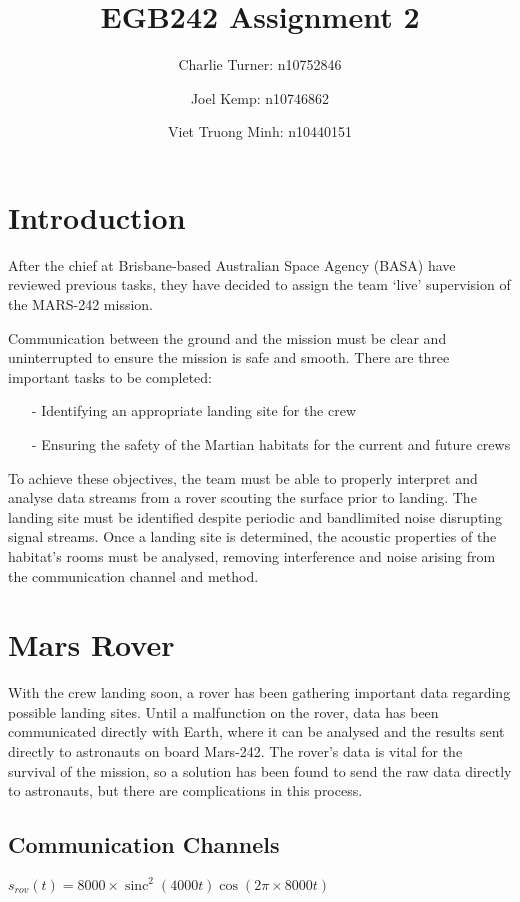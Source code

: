 \documentclass[a4paper]{article}
\author{
    Charlie Turner: n10752846
    \and
    Joel Kemp: n10746862
    \and
    Viet Truong Minh: n10440151
}
\title{EGB242 Assignment 2}
\DeclareMathOperator{\sinc}{sinc}
\begin{document}
\begin{titlingpage}
    \maketitle
\end{titlingpage}

\section{Introduction}

After the chief at Brisbane-based Australian Space Agency (BASA) have reviewed
previous tasks, they have decided to assign the team `live' supervision of the
MARS-242 mission.

Communication between the ground and the mission must be clear and
uninterrupted to ensure the mission is safe and smooth. There are three
important tasks to be completed:
\begin{itemize}
    \item[-] Identifying an appropriate landing site for the crew
    \item[-] Ensuring the safety of the Martian habitats for the current and future crews
\end{itemize}

\noindent To achieve these objectives, the team must be able to properly interpret and
analyse data streams from a rover scouting the surface prior to landing.
The landing site must be identified despite periodic and bandlimited noise
disrupting signal streams. Once a landing site is determined, the acoustic
properties of the habitat's rooms must be analysed, removing interference and
noise arising from the communication channel and method.

\section{Mars Rover}

With the crew landing soon, a rover has been gathering important data regarding
possible landing sites. Until a malfunction on the rover, data has been
communicated directly with Earth, where it can be analysed and the results sent
directly to astronauts on board Mars-242. The rover's data is vital for the
survival of the mission, so a solution has been found to send the raw data
directly to astronauts, but there are complications in this process.

\subsection*{Communication Channels}
\begin{math}
    s_{rov}(t) = 8000 \times \sinc^2(4000t)\cos(2\pi \times 8000t)
\end{math}
\end{document}
